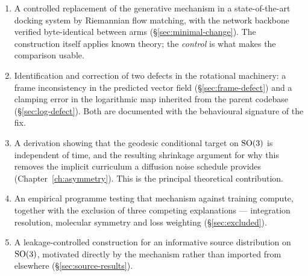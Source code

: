 \begin{enumerate}[leftmargin=*,itemsep=2pt]
\item A controlled replacement of the generative mechanism in a
      state-of-the-art docking system by Riemannian flow matching, with the
      network backbone verified byte-identical between arms
      (\S\ref{sec:minimal-change}). The construction itself applies known
      theory; the \emph{control} is what makes the comparison usable.
\item Identification and correction of two defects in the rotational
      machinery: a frame inconsistency in the predicted vector field
      (\S\ref{sec:frame-defect}) and a clamping error in the logarithmic map
      inherited from the parent codebase (\S\ref{sec:log-defect}). Both are
      documented with the behavioural signature of the fix.
\item A derivation showing that the geodesic conditional target on $\mathrm{SO}(3)$
      is independent of time, and the resulting shrinkage argument for why
      this removes the implicit curriculum a diffusion noise schedule provides
      (Chapter~\ref{ch:asymmetry}). This is the principal theoretical
      contribution.
\item An empirical programme testing that mechanism against training compute,
      together with the exclusion of three competing explanations ---
      integration resolution, molecular symmetry and loss weighting
      (\S\ref{sec:excluded}).
\item A leakage-controlled construction for an informative source
      distribution on $\mathrm{SO}(3)$, motivated directly by the mechanism rather
      than imported from elsewhere (\S\ref{sec:source-results}).
\end{enumerate}

